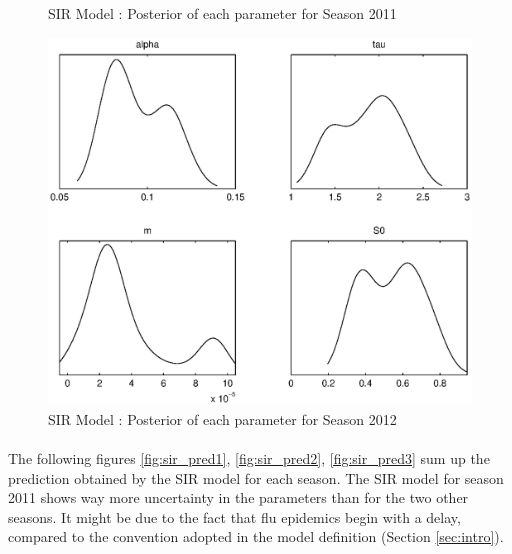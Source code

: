 \documentclass[11pt, a4paper]{article}
\begin{document}
\begin{figure}[H!]
    \caption{SIR Model : Posterior of each parameter for Season 2011}
    \label{fig:sir_post2}
    \includegraphics[height = 0.25\textheight]{figures/SIR_posterior_season3.eps}
    \caption{SIR Model : Posterior of each parameter for Season 2012}
    \label{fig:sir_post3}
\end{figure}


\paragraph{}
The following figures \ref{fig:sir_pred1}, \ref{fig:sir_pred2}, \ref{fig:sir_pred3} sum up the prediction obtained by the SIR model for each season. The SIR model for season 2011 shows way more uncertainty in the parameters than for the two other seasons. It might be due to the fact that flu epidemics begin with a delay, compared to the convention adopted in the model definition (Section \ref{sec:intro}).
\end{document}

